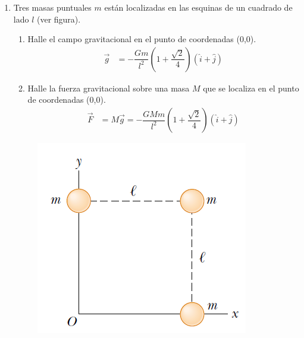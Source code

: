 \documentclass[11pt,twocolumn]{article}
\begin{document}
\begin{enumerate}
\item Tres masas puntuales $m$ están localizadas en las esquinas de un cuadrado de lado $l$ (ver figura). 
\begin{enumerate}
\item Halle el campo gravitacional en el punto de coordenadas (0,0).
\begin{align*}
\vec{g}&=-\dfrac{Gm}{l^2}\left(1+\dfrac{\sqrt{2}}{4}\right)\left(\hat{i}+\hat{j}\right)
\end{align*}
\item Halle la fuerza gravitacional sobre una masa $M$ que se localiza en el punto de coordenadas (0,0).
\begin{align*}
\vec{F}&= M\vec{g}=-\dfrac{GMm}{l^2}\left(1+\dfrac{\sqrt{2}}{4}\right)\left(\hat{i}+\hat{j}\right)
\end{align*}
\end{enumerate}

\begin{figure}[h]
\centering
\includegraphics[scale=0.5]{fig5}
\end{figure}



\end{enumerate}
\end{document}
